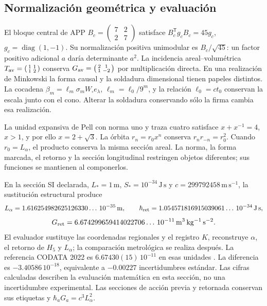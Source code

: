\subsection{Normalización geométrica y evaluación}
\label{md:rigidez:evaluacion}

El bloque central de APP
$B_c=\left(\begin{smallmatrix}7&2\\2&7\end{smallmatrix}\right)$
satisface $B_c^{\mathsf T}g_cB_c=45g_c$,
$g_c=\operatorname{diag}(1,-1)$. Su normalización positiva unimodular es
$B_c/\sqrt{45}$: un factor positivo adicional $a$ daría determinante $a^2$.
La incidencia areal--volumétrica
$T_{\rm av}=\left(\begin{smallmatrix}1&1\\1&2\end{smallmatrix}\right)$
conserva
$G_{\rm av}=\left(\begin{smallmatrix}2&1\\1&-2\end{smallmatrix}\right)$
por multiplicación directa.
En una realización de Minkowski la forma causal y la soldadura dimensional
tienen papeles distintos. La cocadena
$\beta_m=\ell_m\sigma_mW_\square e_\lambda$,
$\ell_m=\ell_0/9^m$, y la relación $\ell_0=ct_0$ conservan la escala
junto con el cono. Alterar la soldadura conservando sólo la firma cambia
esa realización.

La unidad expansiva de Pell con norma uno y traza cuatro satisface
$x+x^{-1}=4$, $x>1$, y por ello $x=2+\sqrt3$.
La órbita $r_n=r_0x^n$ conserva $r_nr_{-n}=r_0^2$.
Cuando $r_0=L_\alpha$, el producto conserva la misma sección areal.
La norma, la forma marcada, el retorno y la sección longitudinal restringen
objetos diferentes; sus funciones se mantienen al componerlos.

En la sección SI declarada, $L_*=1\,\mathrm m$,
$S_*=10^{-34}\,\mathrm{J\,s}$ y $c=299792458\,\mathrm{m\,s^{-1}}$,
la sustitución estructural produce
\[
 L_\alpha=1.616254982625126330\ldots\,10^{-35}\,\mathrm m,\qquad
 \hbar_{\rm ret}=1.054571816915039061\ldots\,10^{-34}\,\mathrm{J\,s},
\]
\begin{equation}
 G_{\rm ret}=6.674299659414022706\ldots\,10^{-11}
 \,\mathrm{m^3\,kg^{-1}\,s^{-2}}.
 \label{md:rigidez:valor}
\end{equation}
El evaluador sustituye las coordenadas regionales y el registro $K$,
reconstruye $\alpha$, el retorno de $H_5$ y $L_\alpha$; la comparación
metrológica se realiza después. La referencia CODATA 2022 es
$6.67430(15)\,10^{-11}$ en esas unidades \cite{codata2022}.
La diferencia es $-3.40586\,10^{-18}$, equivalente a
$-0.00227$ incertidumbres estándar. Las cifras calculadas describen la
evaluación matemática en esta sección, no una incertidumbre experimental.
Las secciones de acción previa y retornada conservan sus etiquetas y
$\hbar_aG_a=c^3L_\alpha^2$.

